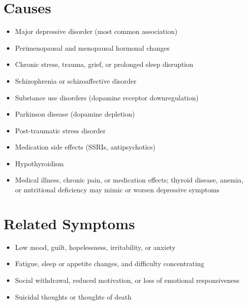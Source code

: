 \section*{Causes}
\begin{itemize}
 \item Major depressive disorder (most common association)
 \item Perimenopausal and menopausal hormonal changes
 \item Chronic stress, trauma, grief, or prolonged sleep disruption
 \item Schizophrenia or schizoaffective disorder
 \item Substance use disorders (dopamine receptor downregulation)
 \item Parkinson disease (dopamine depletion)
 \item Post-traumatic stress disorder
 \item Medication side effects (SSRIs, antipsychotics)
 \item Hypothyroidism
 \item Medical illness, chronic pain, or medication effects; thyroid disease, anemia, or nutritional deficiency may mimic or worsen depressive symptoms
\end{itemize}

\section*{Related Symptoms}
\begin{itemize}
 \item Low mood, guilt, hopelessness, irritability, or anxiety
 \item Fatigue, sleep or appetite changes, and difficulty concentrating
 \item Social withdrawal, reduced motivation, or loss of emotional responsiveness
 \item Suicidal thoughts or thoughts of death
\end{itemize}


